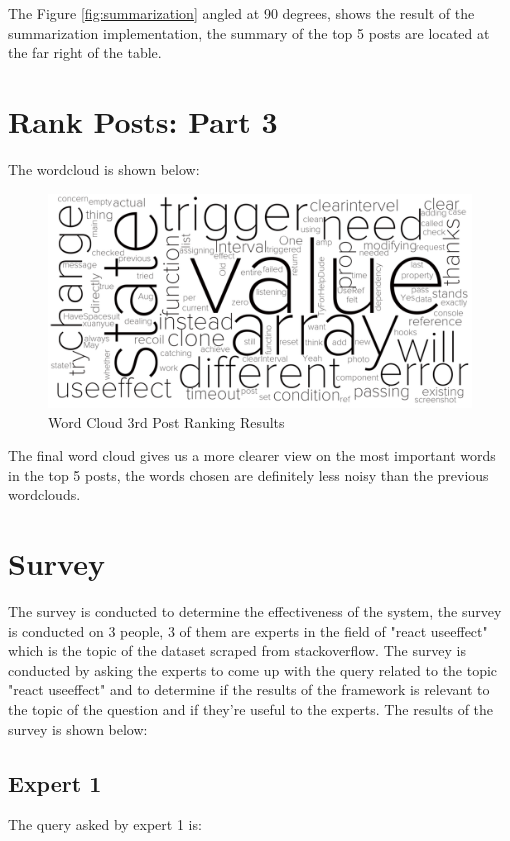 The Figure \ref{fig:summarization} angled at 90 degrees, shows the result of the summarization implementation, the summary of the top 5 posts are located at the far right of the table.

\section{Rank Posts: Part 3} \label{rank-posts_3_results}
The wordcloud is shown below:

\begin{figure}[H]
  \centering
  \includegraphics[scale=0.35]{assets/rank_post_3.png}
  \caption{Word Cloud 3rd Post Ranking  Results}
  \label{fig:rank_post_3_wc}
\end{figure}

\noindent The final word cloud gives us a more clearer view on the most important words in the top 5 posts, the words chosen are definitely less noisy than the previous wordclouds.

\section{Survey} \label{survey_results}
The survey is conducted to determine the effectiveness of the system, the survey is conducted on 3 people, 3 of them are experts in the field of "react useeffect" which is the topic of the dataset scraped from stackoverflow. The survey is conducted by asking the experts to come up with the query related to the topic "react useeffect" and to determine if the results of the framework is relevant to the topic of the question and if they're useful to the experts. The results of the survey is shown below:

\subsection{Expert 1} \label{survey_expert_1}
The query asked by expert 1 is:

